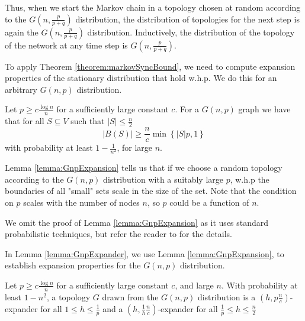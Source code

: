 Thus, when we start the Markov chain in a topology chosen at random according to the $G(n, \frac{p}{p+q})$ distribution, the distribution of topologies for the next step is again the $G(n, \frac{p}{p+q})$ distribution. Inductively, the distribution of the topology of the network at any time step is $G(n, \frac{p}{p+q})$.

To apply Theorem \ref{theorem:markovSyncBound}, we need to compute expansion properties of the stationary distribution that hold w.h.p. We do this for an arbitrary $G(n, p)$ distribution.

\begin{lemma}\label{lemma:GnpExpansion}
	Let $p \geq c\frac{\log n}{n}$ for a sufficiently large constant $c$. For a $G(n, p)$ graph we have that for all $S \subseteq V$ such that $|S| \leq \frac{n}{2}$
	$$
		|B(S)| \geq \frac{n}{c} \min \left\{ |S|p, 1 \right\} 
	$$
	with probability at least $1 - \frac{1}{n^2}$, for large $n$. 
\end{lemma}

Lemma \ref{lemma:GnpExpansion} tells us that if we choose a random topology according to the $G(n, p)$ distribution with a suitably large $p$, w.h.p the boundaries of all "small" sets scale in the size of the set. Note that the condition on $p$ scales with the number of nodes $n$, so $p$ could be a function of $n$. %

We omit the proof of Lemma \ref{lemma:GnpExpansion} as it uses standard probabilistic techniques, but refer the reader to \cite{syncPaper} for the details.

In Lemma \ref{lemma:GnpExpander}, we use Lemma \ref{lemma:GnpExpansion}, to establish expansion properties for the $G(n,p)$ distribution.

\begin{lemma}\label{lemma:GnpExpander}
	Let $p \geq c\frac{\log n}{n}$ for a sufficiently large constant $c$, and large $n$. With probability at least $1- n^2$, a topology $G$ drawn from the $G(n, p)$ distribution is a $(h, p\frac{n}{c})$-expander for all $1 \leq h \leq \frac{1}{p}$ and a $(h, \frac{1}{h}\frac{n}{c})$-expander for all $\frac{1}{p} \leq h \leq \frac{n}{2}$
\end{lemma}


